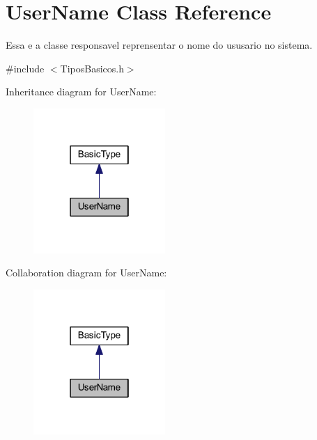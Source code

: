\hypertarget{class_user_name}{\section{User\-Name Class Reference}
\label{class_user_name}
}


Essa e a classe responsavel reprensentar o nome do ususario no sistema.  




{\ttfamily \#include $<$Tipos\-Basicos.\-h$>$}



Inheritance diagram for User\-Name\-:\nopagebreak
\begin{figure}[H]
\begin{center}
\leavevmode
\includegraphics[width=142pt]{class_user_name__inherit__graph}
\end{center}
\end{figure}


Collaboration diagram for User\-Name\-:\nopagebreak
\begin{figure}[H]
\begin{center}
\leavevmode
\includegraphics[width=142pt]{class_user_name__coll__graph}
\end{center}
\end{figure}
